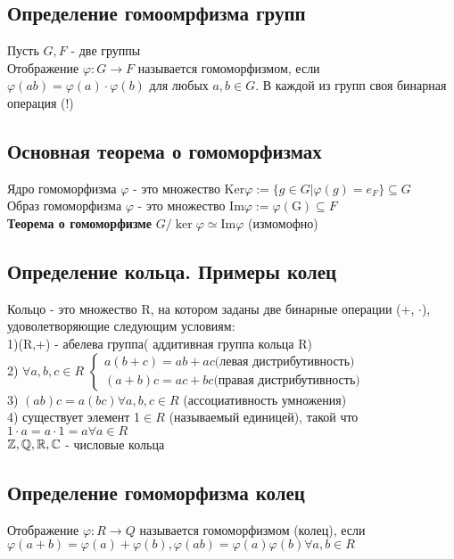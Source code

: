 \subsection{Определение гомоомрфизма групп}
Пусть $ G, F$ - две группы \\
Отображение $ \varphi: G\to F$ называется гомоморфизмом, если $\varphi(ab) = \varphi(a)\cdot\varphi(b)$ для любых $a,b \in G$. В каждой из групп своя бинарная операция (!)
\subsection{Основная теорема о гомоморфизмах}
Ядро гомоморфизма $\varphi$ - это множество Ker$\varphi:=\{g\in G|\varphi(g) = e_{F}\}\subseteq G$\\
Образ гомоморфизма $\varphi$ - это множество Im$\varphi:=\varphi(\text{G})\subseteq F$\\
\textbf{Теорема о гомоморфизме} $G/\ker\varphi \simeq \text{Im}\varphi$ (измомофно)
\subsection{Определение кольца. Примеры колец}
Кольцо - это множество R, на котором заданы две бинарные операции (+, $\cdot$), удоволетворяющие следующим условиям: \\
1)(R,+) - абелева группа( аддитивная группа кольца R) \\
2) $\forall a,b,c \in R$ $\begin{cases} a(b+c) = ab+ac \text{(левая дистрибутивность)} \\
	(a+b)c = ac + bc \text{(правая дистрибутивность)}
\end{cases}$\\
3) $(ab)c = a(bc) \forall a,b,c \in R$ (ассоциативность умножения)\\
4) существует элемент 1$\in R$ (называемый единицей), такой что $1\cdot a = a\cdot 1= a \forall a\in R$\\
$\mathbb{Z}, \mathbb{Q}, \mathbb{R}, \mathbb{C}$ - числовые кольца\\
\subsection{Определение гомоморфизма колец}
Отображение $\varphi: R\to Q$ называется гомоморфизмом (колец), если $\varphi(a+b) = \varphi(a) +\varphi(b),\varphi(ab) = \varphi(a)\varphi(b) \forall a,b\in R$
